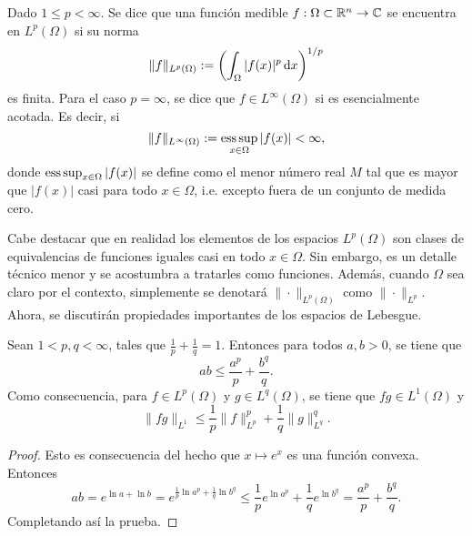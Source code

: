 \begin{definition}
    Dado $1\leq p < \infty$. Se dice que una función medible $f:\Omega\subset\mathbb{R}^n\rightarrow\mathbb{C}$ se encuentra en $L^p(\Omega)$ si su norma 
    \begin{equation*}
        \|f\|_{L^p(\Omega)} := \left( \int_\Omega |f(x)|^p \mathop{}\!\mathrm{d} x
        \right)^{1/p}
    \end{equation*}
    es finita. Para el caso $p=\infty$, se dice que $f\in L^\infty(\Omega)$
    si es esencialmente acotada. Es decir, si
    \begin{equation*}
        \|f\|_{L^\infty(\Omega)} := \operatorname*{ess\,sup}_{x\in\Omega}|f(x)| < \infty,
    \end{equation*}
    donde $\operatorname*{ess\,sup}_{x\in\Omega}|f(x)|$ se define como el menor número real $M$
    tal que es mayor que $|f(x)|$ casi para todo $x\in\Omega$, i.e. excepto fuera de
    un conjunto de medida cero.
\end{definition}
Cabe destacar que en realidad los elementos de los espacios $L^p(\Omega)$
son clases de equivalencias de funciones iguales casi en todo $x\in\Omega$.
Sin embargo, es un detalle técnico menor y se acostumbra a tratarles como funciones.
Además, cuando $\Omega$ sea claro por el contexto, simplemente se denotará
$\|\cdot\|_{L^p(\Omega)}$ como $\|\cdot\|_{L^p}$. Ahora, se discutirán propiedades 
importantes de los espacios de Lebesgue.
\begin{proposition}
    Sean $1< p, q< \infty$, tales que $\frac{1}{p} + \frac{1}{q} = 1$.
    Entonces para todos $a, b > 0$, se tiene que 
    \begin{equation*}
        ab \leq \frac{a^p}{p} + \frac{b^q}{q}.
    \end{equation*}
    Como consecuencia, para $f\in L^p(\Omega)$ y $g \in L^q(\Omega)$,
    se tiene que $fg \in L^1(\Omega)$ y 
    \begin{equation*}
        \|fg\|_{L^1} \leq \frac{1}{p}\|f\|^p_{L^p} + \frac{1}{q}
        \|g\|_{L^q}^q.
    \end{equation*}
\end{proposition}
\begin{proof}
    Esto es consecuencia del hecho que $x\mapsto e^x$ es una función
    convexa. Entonces
    \begin{equation*}
        ab = e^{\ln a + \ln b} = e^{\frac{1}{p}\ln a^p + 
        \frac{1}{q}\ln b^q} \leq \frac{1}{p}e^{\ln a^p} +
        \frac{1}{q}e^{\ln b^q} = \frac{a^p}{p} + \frac{b^q}{q}.
    \end{equation*}
    Completando así la prueba.
\end{proof}
